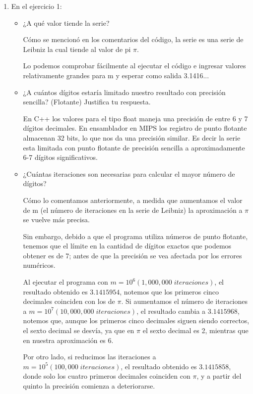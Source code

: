 \documentclass[12pt,letterpaper]{article}
\begin{document}
\begin{enumerate}
\item En el ejercicio 1:
  \begin{itemize}
  \item ¿A qué valor tiende la serie?
    
    Cómo se mencionó en los comentarios del código, la serie es una serie de Leibniz la cual tiende al valor de pi $\pi$.

    Lo podemos comprobar fácilmente al ejecutar el código e ingresar valores relativamente grandes para m y esperar como salida 3.1416...\\
    
  \item ¿A cuántos dígitos estaría limitado nuestro resultado con precisión sencilla? (Flotante) Justifica tu respuesta.
    
    En C++ los valores para el tipo float maneja una precisión de entre 6 y 7 dígitos decimales.
    En ensamblador en MIPS los registro de punto flotante almacenan 32 bits, lo que nos da una precisión similar. Es decir la serie esta limitada con punto flotante de precisión sencilla a aproximadamente 6-7 dígitos significativos.\\
    
  \item ¿Cuántas iteraciones son necesarias para calcular el mayor número de dígitos?
    
    Cómo lo comentamos anteriormente, a medida que aumentamos el valor de m (el número de iteraciones en la serie de Leibniz) la aproximación a $\pi$ se vuelve más precisa.

    Sin embargo, debido a que el programa utiliza números de punto flotante, tenemos que el límite en la cantidad de dígitos exactos que podemos obtener es de 7; antes de que la precisión se vea afectada por los errores numéricos.

    Al ejecutar el programa con $m = 10^6 (1,000,000 \; iteraciones)$, el resultado obtenido es $3.1415954$, notemos que los primeros cinco decimales coinciden con los de $\pi$. Si aumentamos el número de iteraciones a $m = 10^7 (10,000,000 \; iteraciones)$, el resultado cambia a $3.1415968$, notemos que, aunque los primeros cinco decimales siguen siendo correctos, el sexto decimal se desvía, ya que en $\pi$ el sexto decimal es 2, mientras que en nuestra aproximación es 6.

    Por otro lado, si reducimos las iteraciones a $m = 10^5 (100,000 \; iteraciones)$, el resultado obtenido es $3.1415858$, donde solo los cuatro primeros decimales coinciden con $\pi$, y a partir del quinto la precisión comienza a deteriorarse.
    

\end{itemize}
\end{enumerate}
\end{document}
